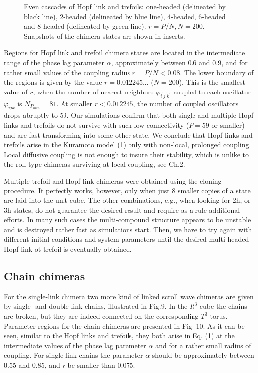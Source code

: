 \documentclass[epjST]{svjour}
\begin{document}
\begin{figure}[h]
\caption{Even cascades of Hopf link and trefoils:  one-headed (delineated by black line), 
2-headed (delineated by blue line), 
4-headed,
6-headed and 
8-headed (delineated by green line).
$r =P/N, N=200$. Snapshots of the chimera states are shown in inserts.}
  \label{fig:8} 
\end{figure}

Regions for Hopf link and trefoil chimera states are located in the intermediate range of the phase lag parameter $\alpha$, approximately between 0.6 and 0.9, and for rather small values of the coupling radius $r=P/N<0.08$. The lower boundary of the regions is given by the value $r=0.012245...$ ($N=200$). This is the smallest value of $r$,  when the number of nearest neighbors  $\varphi_{i^{\prime}j^{\prime}k^{\prime}}$  coupled to each oscillator $\varphi_{ijk}$  is $N_{P_{min}}=81$. At smaller $r<0.012245$, the number of coupled oscillators drops abruptly to 59.  Our simulations confirm that both single and multiple Hopf links and trefoils do not survive with such low connectivity ($P=59$ or smaller) and are fast transforming into some other state. We conclude that Hopf links and trefoils arise in the Kuramoto model (1) only with non-local, prolonged coupling.  Local diffusive coupling is not enough to insure their stability, which is unlike to the roll-type chimeras surviving at local coupling, see Ch.2.
 

Multiple trefoil and Hopf link chimeras were obtained using the cloning procedure.  It perfectly works, however, only when just 8 smaller copies of a state are laid into the unit cube. 
The other combinations, e.g., when looking for 2h, or 3h states,   do not guarantee the desired result and require as a rule  additional efforts.  In many such cases the multi-compound structure appears to be unstable and is destroyed rather fast as simulations start. Then, we have to try again with different initial conditions and system parameters until the desired multi-headed Hopf link ot trefoil is eventually obtained.  
 
\vspace*{-0.5cm}
\subsection{Chain chimeras}


\hspace*{0.5cm} For the single-link chimera two more kind of linked scroll wave chimeras are given by single- and double-link chains, illustrated in Fig.9.  In the $R^3$-cube the chains are broken, but  they are indeed connected on the corresponding $T^3$-torus.   Parameter regions for the chain chimeras are presented in Fig. 10. As it can be seen, similar to the Hopf links and trefoils, they both arise in Eq. (1) at the intermediate values of the phase lag parameter $\alpha$ and for a rather small radius of coupling. For single-link chains the parameter $\alpha$ should be approximately between 0.55 and 0.85,  and $r$ be smaller than 0.075. 
\end{document}
